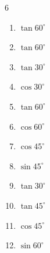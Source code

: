 \begin{multicols}{6}
\begin{enumerate}

  \item $\displaystyle \tan{60^\circ}$


  \item $\displaystyle \tan{60^\circ}$


\columnbreak %

  \item $\displaystyle \tan{30^\circ}$


  \item $\displaystyle \cos{30^\circ}$


  \item $\displaystyle \tan{60^\circ}$


  \item $\displaystyle \cos{60^\circ}$


  \item $\displaystyle \cos{45^\circ}$


  \item $\displaystyle \sin{45^\circ}$


  \item $\displaystyle \tan{30^\circ}$


  \item $\displaystyle \tan{45^\circ}$

        \phantom{$\displaystyle =1$}

  \item $\displaystyle \cos{45^\circ}$


  \item $\displaystyle \sin{60^\circ}$



\end{enumerate}
\end{multicols}
